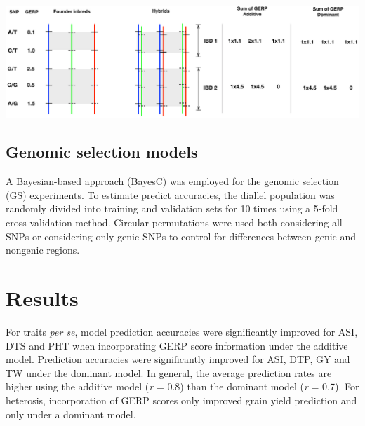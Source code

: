 \documentclass[a0,portrait]{a0poster}
\begin{document}
\begin{multicols}{2}
\begin{center}\vspace{1cm}
\includegraphics[width=1\linewidth]{gerpIBD.pdf}
\end{center}\vspace{1cm}

\subsection*{Genomic selection models}

A Bayesian-based approach (BayesC) \citep{Habier2011} was employed for the genomic selection (GS) experiments. To estimate predict accuracies, the diallel population was randomly divided into training and validation sets for 10 times using a 5-fold cross-validation method. Circular permutations were used both considering all SNPs or considering only genic SNPs to control for differences between genic and nongenic regions.



\section*{Results}

For traits \emph{per se}, model prediction accuracies were significantly improved for ASI, DTS and PHT when incorporating GERP score information under the additive model. Prediction accuracies were significantly improved for ASI, DTP, GY and TW under the dominant model. In general, the average prediction rates are higher using the additive model (\emph{r} = 0.8) than the dominant model (\emph{r} = 0.7). For heterosis, incorporation of GERP scores only improved grain yield prediction and only under a dominant model.  


\end{multicols}
\end{document}

